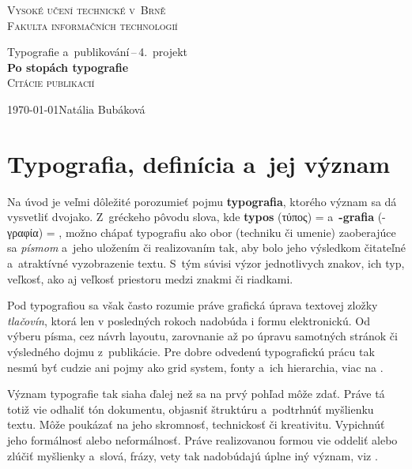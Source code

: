 \documentclass[11pt]{article}
\newcommand{\textgreek}[1]{\begingroup\fontencoding{LGR}\selectfont#1\endgroup}
\begin{document}
\begin{titlepage}
    \begin{center}
        {\Huge\scshape Vysoké učení technické v~Brně \\
        \huge\vspace{0.4em}Fakulta informačních technologií}
        
        {\LARGE Typografie a~publikování\,--\,4.~projekt \\
        \Huge\vspace{0.6em}\textbf{Po stopách typografie}\\\LARGE\scshape\vspace{0.6em}Citácie publikacií}
    \end{center}
    
    {\Large \today \hfill Natália Bubáková}
\end{titlepage}

\newpage
\section{Typografia, definícia a~jej význam}
Na úvod je veľmi dôležité porozumieť pojmu \textbf{typografia}, ktorého význam sa dá vysvetliť dvojako. Z~gréckeho pôvodu slova, kde \textbf{typos} (\textgreek{τύπος})
=  a~\textbf{-grafia} (\textgreek{-γραφία})
= , možno chápať typografiu ako obor (techniku či umenie) zaoberajúce sa \emph{písmom} a~jeho uložením či realizovaním tak, aby bolo jeho výsledkom  čitateľné a~atraktívné vyzobrazenie textu. S~tým súvisi výzor jednotlivych znakov, ich typ, veľkosť, ako aj veľkosť priestoru medzi znakmi či riadkami. \cite{wiki}\par
Pod typografiou sa však často rozumie práve grafická úprava textovej zložky \emph{tlačovín}, ktorá len v posledných rokoch nadobúda i formu elektronickú. Od výberu písma, cez návrh layoutu, zarovnanie až po úpravu samotných stránok či výsledného dojmu z~publikácie. Pre dobre odvedenú typografickú prácu tak nesmú byť cudzie ani pojmy ako grid system, fonty a~ich hierarchia, viac na \cite{detepe}.\par
Význam typografie tak siaha ďalej než sa na prvý pohľad môže zdať. Práve tá totiž vie odhaliť tón dokumentu, objasniť štruktúru a~podtrhnúť myšlienku textu. Môže poukázať na jeho skromnosť, technickosť či kreativitu. Vypichnúť jeho formálnosť alebo neformálnosť. Práve realizovanou formou vie oddeliť alebo zlúčiť myšlienky a~slová, frázy, vety tak nadobúdajú úplne iný význam, viz \cite{nature}.
\end{document}
